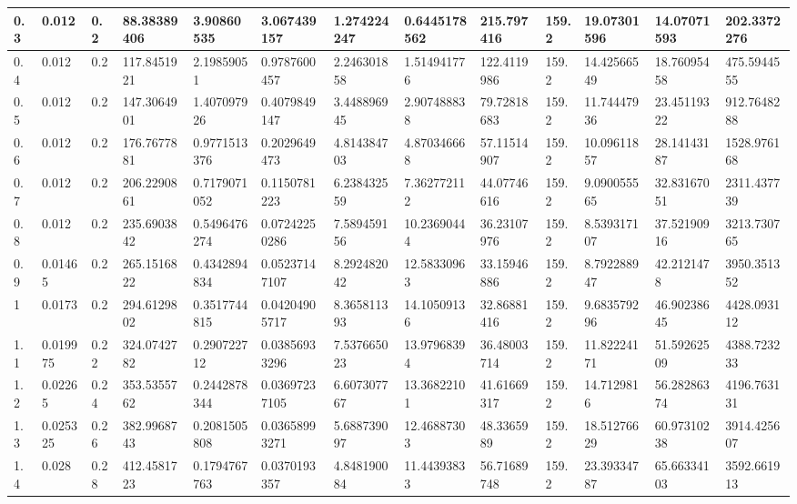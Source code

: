 \documentclass[12pt]{report}
\begin{document}
\begin{table}[H]
{\begin{tabular}{|l|l|l|l|l|l|l|l|l|l|l|l|l|}
0.3 & 0.012         & 0.2  & 88.38389406 & 3.90860535    & 3.067439157   & 1.274224247  & 0.6445178562  & 215.797416  & 159.2 & 19.07301596 & 14.07071593 & 202.3372276 \\ \hline
0.4 & 0.012         & 0.2  & 117.8451921 & 2.19859051    & 0.9787600457  & 2.246301858  & 1.514941776   & 122.4119986 & 159.2 & 14.42566549 & 18.76095458 & 475.5944555 \\ \hline
0.5 & 0.012         & 0.2  & 147.3064901 & 1.407097926   & 0.4079849147  & 3.448896945  & 2.907488838   & 79.72818683 & 159.2 & 11.74447936 & 23.45119322 & 912.7648288 \\ \hline
0.6 & 0.012         & 0.2  & 176.7677881 & 0.9771513376  & 0.2029649473  & 4.814384703  & 4.870346668   & 57.11514907 & 159.2 & 10.09611857 & 28.14143187 & 1528.976168 \\ \hline
0.7 & 0.012         & 0.2  & 206.2290861 & 0.7179071052  & 0.1150781223  & 6.238432559  & 7.362772112   & 44.07746616 & 159.2 & 9.090055565 & 32.83167051 & 2311.437739 \\ \hline
0.8 & 0.012         & 0.2  & 235.6903842 & 0.5496476274  & 0.07242250286 & 7.589459156  & 10.23690444   & 36.23107976 & 159.2 & 8.539317107 & 37.52190916 & 3213.730765 \\ \hline
0.9 & 0.01465       & 0.2  & 265.1516822 & 0.4342894834  & 0.05237147107 & 8.292482042  & 12.58330963   & 33.15946886 & 159.2 & 8.792288947 & 42.2121478  & 3950.351352 \\ \hline
1   & 0.0173        & 0.2  & 294.6129802 & 0.3517744815  & 0.04204905717 & 8.365811393  & 14.10509136   & 32.86881416 & 159.2 & 9.683579296 & 46.90238645 & 4428.093112 \\ \hline
1.1 & 0.019975      & 0.22 & 324.0742782 & 0.290722712   & 0.03856933296 & 7.537665023  & 13.97968394   & 36.48003714 & 159.2 & 11.82224171 & 51.59262509 & 4388.723233 \\ \hline
1.2 & 0.02265       & 0.24 & 353.5355762 & 0.2442878344  & 0.03697237105 & 6.607307767  & 13.36822101   & 41.61669317 & 159.2 & 14.7129816  & 56.28286374 & 4196.763131 \\ \hline
1.3 & 0.025325      & 0.26 & 382.9968743 & 0.2081505808  & 0.03658993271 & 5.688739097  & 12.46887303   & 48.3365989  & 159.2 & 18.51276629 & 60.97310238 & 3914.425607 \\ \hline
1.4 & 0.028         & 0.28 & 412.4581723 & 0.1794767763  & 0.0370193357  & 4.848190084  & 11.44393833   & 56.71689748 & 159.2 & 23.39334787 & 65.66334103 & 3592.661913 \\ \hline

\end{tabular}}
\end{table}
\end{document}
